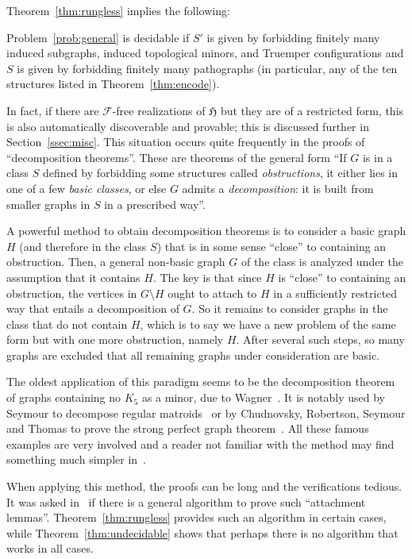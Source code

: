 \documentclass{article}
\newcommand{\Fc}{\mathcal{F}}
\newcommand{\Hf}{\mathfrak{H}}
\begin{document}
Theorem~\ref{thm:rungless} implies the following:
\begin{corollary}
Problem~\ref{prob:general} is decidable if $S'$ is given by forbidding finitely many induced subgraphs, induced topological minors, and Truemper configurations and $S$ is given by forbidding finitely many pathographs (in particular, any of the ten structures listed in Theorem~\ref{thm:encode}).
\end{corollary}

In fact, if there are $\Fc$-free realizations of $\Hf$ but they are of a restricted form, this is also automatically discoverable and provable; this is discussed further in Section~\ref{ssec:misc}. This situation occurs quite frequently in the proofs of ``decomposition theorems''. These are theorems of the general form ``If $G$ is in a class $S$ defined by forbidding some structures called \textit{obstructions}, it either lies in one of a few \textit{basic classes}, or else $G$ admits a \textit{decomposition}: it is built from smaller graphs in $S$ in a prescribed way''.

A powerful method to obtain decomposition theorems is to consider a basic graph $H$ (and therefore in the class $S$) that is in some sense ``close'' to containing an obstruction. Then, a general non-basic graph $G$ of the class is analyzed under the assumption that it contains $H$. The key is that since $H$ is ``close'' to containing an obstruction, the vertices in $G \setminus H$ ought to attach to $H$ in a sufficiently restricted way that entails a decomposition of $G$. So it remains to consider graphs in the class that do not contain $H$, which is to say we have a new problem of the same form but with one more obstruction, namely $H$. After several such steps, so many graphs are excluded that all remaining graphs under consideration are basic.

The oldest application of this paradigm seems to be the decomposition theorem of graphs containing no $K_5$ as a minor, due to Wagner~\cite{wagner:k5}. It is notably used by Seymour to decompose regular matroids~\cite{seymour:decRegMat} or by Chudnovsky, Robertson, Seymour and Thomas to prove the strong perfect graph theorem~\cite{chudnovsky.r.s.t:spgt}. All these famous examples are very involved and a reader not familiar with the method may find something much simpler in~\cite [Theorem~2.1]{CPST:bull}.

When applying this method, the proofs can be long and the verifications tedious. It was asked in~\cite[Question 2.12]{nicolas:hdr} if there is a general algorithm to prove such ``attachment lemmas''. Theorem~\ref{thm:rungless} provides such an algorithm in certain cases, while Theorem~\ref{thm:undecidable} shows that perhaps there is no algorithm that works in all cases.
\end{document}
